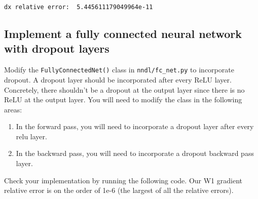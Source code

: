 \documentclass[11pt]{article}
\begin{document}
    \begin{Verbatim}[commandchars=\\\{\}]
dx relative error:  5.445611179049964e-11

    \end{Verbatim}

    \hypertarget{implement-a-fully-connected-neural-network-with-dropout-layers}{%
\subsection{Implement a fully connected neural network with dropout
layers}\label{implement-a-fully-connected-neural-network-with-dropout-layers}}

Modify the \texttt{FullyConnectedNet()} class in
\texttt{nndl/fc\_net.py} to incorporate dropout. A dropout layer should
be incorporated after every ReLU layer. Concretely, there shouldn't be a
dropout at the output layer since there is no ReLU at the output layer.
You will need to modify the class in the following areas:

\begin{enumerate}
\def\labelenumi{(\arabic{enumi})}
\item
  In the forward pass, you will need to incorporate a dropout layer
  after every relu layer.
\item
  In the backward pass, you will need to incorporate a dropout backward
  pass layer.
\end{enumerate}

Check your implementation by running the following code. Our W1 gradient
relative error is on the order of 1e-6 (the largest of all the relative
errors).
\end{document}
